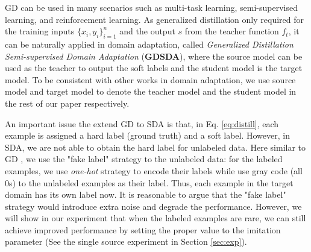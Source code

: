 GD can be used in many scenarios such as multi-task learning, semi-supervised learning, and reinforcement learning. As generalized distillation only required for the training inputs $\{x_i,y_i\}_{i=1}^n$ and the output $s$ from the teacher function $f_t$, it can be naturally applied in domain adaptation, called \textit{Generalized Distillation Semi-supervised Domain Adaptation} (\textbf{GDSDA}), where the source model can be used as the teacher to output the soft labels and the student model is the target model. To be consistent with other works in domain adaptation, we use source model and target model to denote the teacher model and the student model in the rest of our paper respectively.

An important issue the extend GD to SDA is that, in Eq. \eqref{eq:distill}, each example is assigned a hard label (ground truth) and a soft label. However, in SDA, we are not able to obtain the hard label for unlabeled data. Here similar to GD \cite{lopez2015unifying}, we use the "fake label" strategy to the unlabeled data: for the labeled examples, we use \textit{one-hot} strategy to encode their labels while use gray code (all 0s) to the unlabeled examples as their label. Thus, each example in the target domain has its own label now. It is reasonable to argue that the "fake label" strategy would introduce extra noise and degrade the performance. However, we will show in our experiment that when the labeled examples are rare, we can still achieve improved performance by setting the proper value to the imitation parameter (See the single source experiment in Section \ref{sec:exp}).

